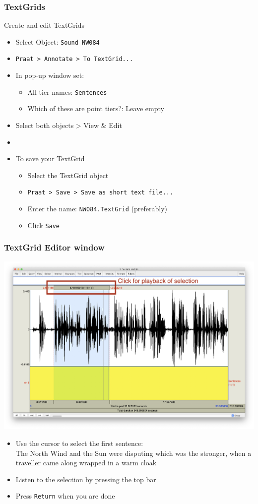 \documentclass{beamer}
\begin{document}
\begin{frame} 
\frametitle{TextGrids} 
\begin{block}{Create and edit TextGrids}
\begin{itemize} 
\item Select Object: \texttt{Sound NW084}
\item \texttt{Praat > Annotate > To TextGrid...} 
\item In pop-up window set:
\begin{itemize} 
\item All tier names: \texttt{Sentences}
\item Which of these are point tiers?: Leave empty
\end{itemize}
\item Select both objects > View \& Edit
\item [ ]
\item To save your TextGrid
\begin{itemize} 
\item Select the TextGrid object
\item \texttt{Praat > Save > Save as short text file...}
\item Enter the name: \texttt{NW084.TextGrid} (preferably)
\item Click \texttt{Save}
\end{itemize}
\end{itemize}
\end{block} 
\end{frame}

\begin{frame} 
\frametitle{TextGrid Editor window} 

\includegraphics[width=0.71\framewidth]{img/Screenshot_TextGrid}
\vspace{-0.5cm}
\begin{itemize}
\item Use the cursor to select the first sentence:\\
      {\scriptsize{The North Wind and the Sun were disputing which was the stronger, when a traveller came along wrapped in a warm cloak}}
\item Listen to the selection by pressing the top bar
\item Press \texttt{Return} when you are done
\end{itemize}

\end{frame}
\end{document}
